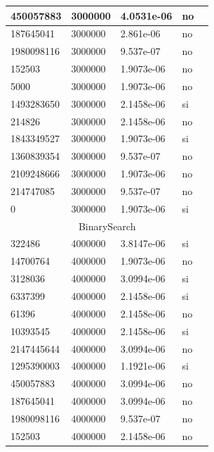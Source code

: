 \documentclass[12pt, fleqn]{article}                             %
\theoremstyle{break}                                            %
\begin{document}
\begin{longtable}{|m{5em}|m{5em}|m{10em}|m{5em}|@{}m{0pt}@{}}
            450057883& 3000000  & 4.0531e-06 & no &\\[1em]    \hline
            187645041& 3000000  & 2.861e-06 & no &\\[1em]    \hline
            1980098116& 3000000  & 9.537e-07 & no &\\[1em]    \hline
            152503& 3000000  & 1.9073e-06 & no &\\[1em]    \hline
            5000& 3000000  & 1.9073e-06 & no &\\[1em]    \hline
            1493283650& 3000000  & 2.1458e-06 & si &\\[1em]    \hline
            214826& 3000000  & 2.1458e-06 & no &\\[1em]    \hline
            1843349527& 3000000  & 1.9073e-06 & si &\\[1em]    \hline
            1360839354& 3000000  & 9.537e-07 & no &\\[1em]    \hline
            2109248666& 3000000  & 1.9073e-06 & no &\\[1em]    \hline
            214747085& 3000000  & 9.537e-07 & no &\\[1em]    \hline
            0& 3000000  & 1.9073e-06 & si &\\[1em]    \hline
            \multicolumn{5}{|c|}{BinarySearch}   \\          \hline
            322486& 4000000  & 3.8147e-06 & si &\\[1em]    \hline
            14700764& 4000000  & 1.9073e-06 & no &\\[1em]    \hline
            3128036& 4000000  & 3.0994e-06 & si &\\[1em]    \hline
            6337399& 4000000  & 2.1458e-06 & si &\\[1em]    \hline
            61396& 4000000  & 2.1458e-06 & no &\\[1em]    \hline
            10393545& 4000000  & 2.1458e-06 & si &\\[1em]    \hline
            2147445644& 4000000  & 3.0994e-06 & no &\\[1em]    \hline
            1295390003& 4000000  & 1.1921e-06 & si &\\[1em]    \hline
            450057883& 4000000  & 3.0994e-06 & no &\\[1em]    \hline
            187645041& 4000000  & 3.0994e-06 & no &\\[1em]    \hline
            1980098116& 4000000  & 9.537e-07 & no &\\[1em]    \hline
            152503& 4000000  & 2.1458e-06 & no &\\[1em]    \hline

\end{longtable}
\end{document}
